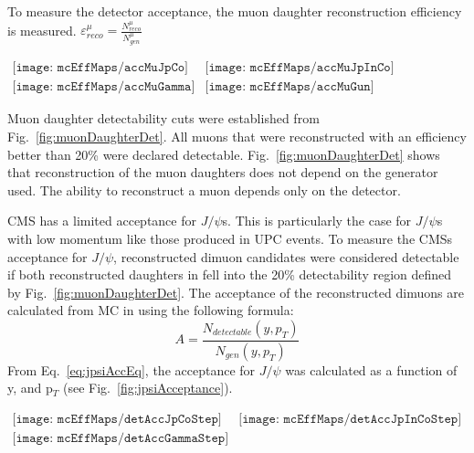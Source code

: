       To measure the detector acceptance, the muon daughter reconstruction 
        efficiency is measured.
        $\varepsilon^{\mu}_{reco} = \frac{N^{\mu}_{reco}}{N^{\mu}_{gen}}$
        \begin{figure*}[!Hhtb]
          \centering
          $ \begin{array}{cc}
            \texttt{[image: mcEffMaps/accMuJpCo]} &
            \texttt{[image: mcEffMaps/accMuJpInCo]} \\
            \texttt{[image: mcEffMaps/accMuGamma]} &
            \texttt{[image: mcEffMaps/accMuGun]}
          \end{array} $
          \caption{ Muon daughter detectability from coherent J/$\psi$, 
            incoherent J/$\psi$, photon-photon, and J/$\psi$ gun samples.}
          \label{fig:muonDaughterDet}
        \end{figure*}
      Muon daughter detectability cuts were established from 
        Fig.~\ref{fig:muonDaughterDet}.
      All muons that were reconstructed with an efficiency better than 20\% 
        were declared detectable.
      Fig.~\ref{fig:muonDaughterDet} shows that reconstruction of the muon 
        daughters does not depend on the generator used.
      The ability to reconstruct a muon depends only on the detector. 

      CMS has a limited acceptance for $J/\psi$s. 
      This is particularly the case for $J/\psi$s with low momentum like those
        produced in UPC events. 
      To measure the CMSs acceptance for $J/\psi$, reconstructed dimuon 
        candidates were considered detectable if both reconstructed daughters 
        in fell into the 20\% detectability region defined by 
        Fig.~\ref{fig:muonDaughterDet}.
      The acceptance of the reconstructed dimuons are calculated from MC in 
        using the following formula:
      \begin{equation}
        A=\frac{N_{detectable}(y,p_{T})}{N_{gen}(y,p_{T})}
        \label{eq:jpsiAccEq}
      \end{equation}
      From Eq.~\ref{eq:jpsiAccEq}, the acceptance for $J/\psi$ was calculated
        as a function of y, and p$_{T}$ (see Fig.~\ref{fig:jpsiAcceptance}).
        \begin{figure*}[!Hhtb]
          \centering
          $ \begin{array}{cc}
            \texttt{[image: mcEffMaps/detAccJpCoStep]} &
            \texttt{[image: mcEffMaps/detAccJpInCoStep]} \\
            \texttt{[image: mcEffMaps/detAccGammaStep]}
          \end{array} $
          \caption{Dimuon acceptance from coherent J/$\psi$ (top left), incoherent 
            J$\psi$ (top right), and photon-photon interactions (lower).}
          \label{fig:jpsiAcceptance}
        \end{figure*}



